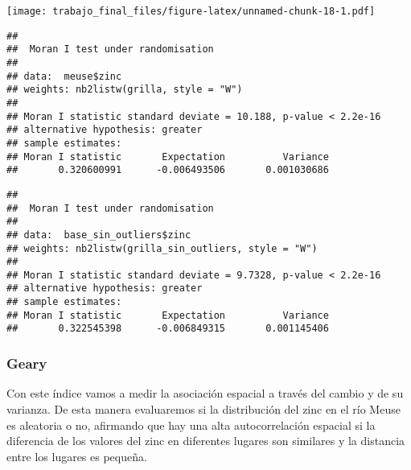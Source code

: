 \documentclass[
  12pt,
]{article}
\newenvironment{Shaded}{\begin{snugshade}}{\end{snugshade}}
\newcommand{\AttributeTok}[1]{\textcolor[rgb]{0.77,0.63,0.00}{#1}}
\newcommand{\CommentTok}[1]{\textcolor[rgb]{0.56,0.35,0.01}{\textit{#1}}}
\newcommand{\ConstantTok}[1]{\textcolor[rgb]{0.00,0.00,0.00}{#1}}
\newcommand{\FunctionTok}[1]{\textcolor[rgb]{0.00,0.00,0.00}{#1}}
\newcommand{\NormalTok}[1]{#1}
\newcommand{\SpecialCharTok}[1]{\textcolor[rgb]{0.00,0.00,0.00}{#1}}
\newcommand{\StringTok}[1]{\textcolor[rgb]{0.31,0.60,0.02}{#1}}
\begin{document}
\texttt{[image: trabajo\_final\_files/figure-latex/unnamed-chunk-18-1.pdf]}

\begin{Shaded}
\end{Shaded}

\begin{verbatim}
## 
##  Moran I test under randomisation
## 
## data:  meuse$zinc  
## weights: nb2listw(grilla, style = "W")    
## 
## Moran I statistic standard deviate = 10.188, p-value < 2.2e-16
## alternative hypothesis: greater
## sample estimates:
## Moran I statistic       Expectation          Variance 
##       0.320600991      -0.006493506       0.001030686
\end{verbatim}

\begin{Shaded}
\end{Shaded}

\begin{verbatim}
## 
##  Moran I test under randomisation
## 
## data:  base_sin_outliers$zinc  
## weights: nb2listw(grilla_sin_outliers, style = "W")    
## 
## Moran I statistic standard deviate = 9.7328, p-value < 2.2e-16
## alternative hypothesis: greater
## sample estimates:
## Moran I statistic       Expectation          Variance 
##       0.322545398      -0.006849315       0.001145406
\end{verbatim}

\hypertarget{geary}{%
\subsubsection{Geary}\label{geary}}

Con este índice vamos a medir la asociación espacial a través del cambio
y de su varianza. De esta manera evaluaremos si la distribución del zinc
en el río Meuse es aleatoria o no, afirmando que hay una alta
autocorrelación espacial si la diferencia de los valores del zinc en
diferentes lugares son similares y la distancia entre los lugares es
pequeña.
\end{document}
